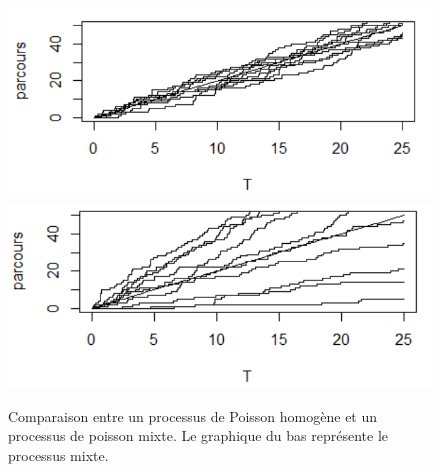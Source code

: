 \begin{figure}[!ht]
    \centering
    \includegraphics[scale=0.5]{src/TheorieDuRisque/SimulationProcessusPoisson.png}
    \includegraphics[scale=0.5]{src/TheorieDuRisque/SimulationProcessusPoissonMixte.png}
    \caption{Comparaison entre un processus de Poisson homogène et un processus de poisson mixte. Le graphique du bas représente le processus mixte.}
\end{figure}

